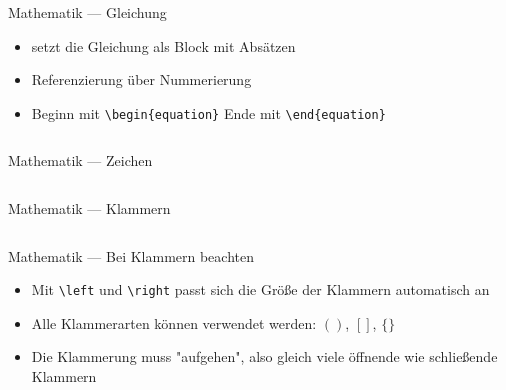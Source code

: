 \documentclass[presentation,aspectratio=169]{beamer}
\begin{document}
\begin{frame}[fragile]{Mathematik --- Gleichung}
  \begin{itemize}
    \item setzt die Gleichung als Block mit Absätzen
    \item Referenzierung über Nummerierung
    \item Beginn mit \verb|\begin{equation}| Ende mit \verb|\end{equation}|
  \end{itemize}
  
  \begin{minipage}{.4\textwidth}
    
  \end{minipage}
  \hfill
  \begin{minipage}{.5\textwidth}
    \inputminted{latex}{codebeispiele/math-equation.tex}
  \end{minipage}
\end{frame}

\begin{frame}[fragile]{Mathematik --- Zeichen}
  \begin{minipage}{.4\textwidth}
    
  \end{minipage}
  \hfill
  \begin{minipage}{.5\textwidth}
    \inputminted{latex}{codebeispiele/math-symbols.tex}
  \end{minipage}
\end{frame}

\begin{frame}[fragile]{Mathematik --- Klammern}
  \begin{minipage}{.3\textwidth}
    
  \end{minipage}
  \hfill
  \begin{minipage}{.6\textwidth}
    \inputminted{latex}{codebeispiele/math-brackets.tex}
  \end{minipage}
\end{frame}

\begin{frame}[fragile]{Mathematik --- Bei Klammern beachten}
  \begin{itemize}
    \item Mit \verb|\left| und \verb|\right| passt sich die Größe der Klammern automatisch an
    \item Alle Klammerarten können verwendet werden: $()$, $[]$, $\{\}$
    \item Die Klammerung muss "aufgehen", also gleich viele öffnende wie schließende Klammern
  \end{itemize}
\end{frame}
\end{document}
